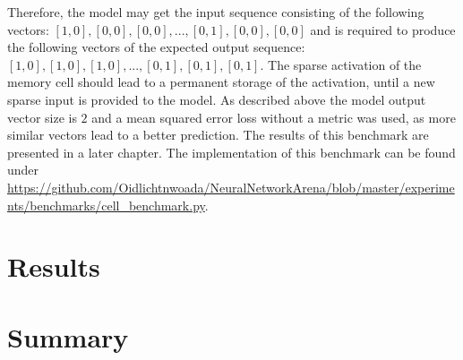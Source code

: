 \documentclass[draft,final]{vutinfth} %
\begin{document}
    Therefore, the model may get the input sequence consisting of the following vectors: $[1,0],[0,0],[0,0],...,[0,1],[0,0],[0,0]$ and is required to produce the following vectors of the expected output sequence: $[1,0],[1,0],[1,0],...,[0,1],[0,1],[0,1]$.
    The sparse activation of the memory cell should lead to a permanent storage of the activation, until a new sparse input is provided to the model.
    As described above the model output vector size is $2$ and a mean squared error loss without a metric was used, as more similar vectors lead to a better prediction.
    The results of this benchmark are presented in a later chapter.
    The implementation of this benchmark can be found under \url{https://github.com/Oidlichtnwoada/NeuralNetworkArena/blob/master/experiments/benchmarks/cell_benchmark.py}.
    
    \chapter{Results}

    \chapter{Summary}


    \backmatter

    \listoffigures %

    \cleardoublepage %
    \listoftables %


    \printindex

    \printglossaries

    
    
\end{document}

